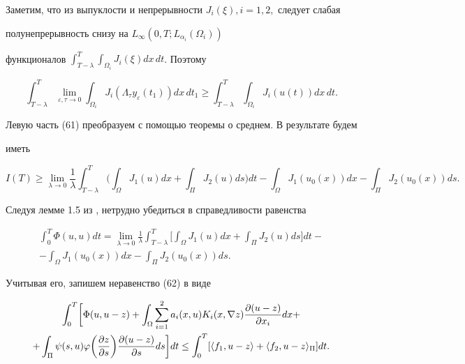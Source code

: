 Заметим, что из выпуклости и непрерывности $J_i(\xi), i=1,2,$ следует слабая 


полунепрерывность снизу на $L_\infty(0,T;L_{\alpha_i}(\Omega_i))$ 


функционалов $\int^T_{T-\lambda}\int_{\Omega_i}J_i(\xi)dx\,dt$. Поэтому 


\begin{equation*} 


\int^T_{T-\lambda}\lim_{\varepsilon,\tau\to 0}\int_{\Omega_i}J_i(\Lambda_\tau y_\varepsilon(t_1)) 


dx\,dt_1 \ge \int^T_{T-\lambda}\int_{\Omega_i}J_i(u(t))dx\,dt. 


\end{equation*} 


Левую часть (61) преобразуем с помощью теоремы о среднем. В результате будем 


иметь 


\begin{equation} 


I(T) \ge \lim_{\lambda \to 0}\frac{1}{\lambda} 


\int^T_{T-\lambda}\biggl(\int_\Omega J_1(u)dx + \int_\Pi 


J_2(u)ds \biggr)dt -  


\int_\Omega J_1(u_0(x))dx - \int_\Pi J_2(u_0(x))ds.


\end{equation} 


Следуя лемме 1.5 из \cite{Alt}, нетрудно убедиться в справедливости равенства 


\begin{gather*} 


\int^T_0 \Phi(u,u)dt = 


\lim_{\lambda \to 0}\frac{1}{\lambda}


\int^T_{T-\lambda}\biggl[\int_\Omega J_1(u)dx + \int_\Pi 


J_2(u)ds \biggr]dt - \\ 


-\int_\Omega J_1(u_0(x))dx - \int_\Pi J_2(u_0(x))ds.


\end{gather*} 


Учитывая его, запишем неравенство (62) в виде 


\begin{gather} 


\int^T_0\biggl [\Phi(u,u-z)+\int_\Omega \sum^2_{i=1}a_i(x,u)K_i 


(x,\nabla z)\frac{\partial (u-z)}{\partial x_i} dx +\notag\\ 


+\int_\Pi \psi(s,u)\varphi \biggl(\frac{\partial z}{\partial s} \biggr) 


\frac{\partial(u-z)}{\partial s}ds\biggr ] dt \le


\int^T_0[\langle f_1,u-z\rangle + \langle f_2,u-z\rangle_\Pi ]dt. 


\end{gather} 


